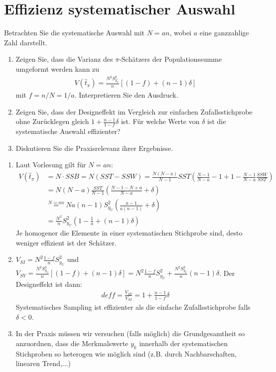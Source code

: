 \documentclass{article}
\begin{document}
\section{Effizienz systematischer Auswahl}
Betrachten Sie die systematische Auswahl mit $N=an$, wobei $a$ eine ganzzahlige Zahl darstellt.
\begin{enumerate}
\item Zeigen Sie, dass die Varianz des $\pi$-Schätzers der Populationssumme umgeformt werden kann zu
\begin{align*}
V(\hat{t}_\pi) = \frac{N^2 S_{y_U}^2}{n} [(1-f)+(n-1)\delta]
\end{align*}
mit $f=n/N=1/a$. Interpretieren Sie den Ausdruck.
\item Zeigen Sie, dass der Designeffekt im Vergleich zur einfachen Zufallsstichprobe ohne Zurücklegen gleich $1+\frac{n-1}{1-f}\delta$ ist. Für welche Werte von $\delta$ ist die systematische Auswahl effizienter?
\item Diskutieren Sie die Praxisrelevanz ihrer Ergebnisse.
\end{enumerate}
\begin{solution}
\begin{enumerate}
\item Laut Vorlesung gilt für $N=an$:
\begin{align*} 
V(\hat{t}_\pi) &= N\cdot SSB = N(SST-SSW) =\frac{N(N-a)}{N-1}SST \left(\frac{N-1}{N-a}-1 +1 -\frac{N-1}{N-a}\frac{SSW}{SST}\right)\\
&= N(N -a)\frac{SST}{N-1}\left(\frac{N-1 -N +a}{N-a} +\delta\right)\\
& \overset{N=an}{=} Na(n-1) S_{y_U}^2 \left(\frac{a-1}{a(n-1)}+\delta\right)\\
& = \frac{N^2}{n} S_{y_U}^2 \left(1-\frac{1}{a}+(n-1)\delta\right)
\end{align*}
Je homogener die Elemente in einer systematischen Stichprobe sind, desto weniger effizient ist der Schätzer.
\item $V_{SI} = N^2\frac{1-f}{n}S_{y_U}^2$ und $V_{SY} = \frac{N^2 S_{y_U}^2}{n} [(1-f)+(n-1)\delta] = N^2\frac{1-f}{n}S_{y_U}^2 + \frac{N^2 S_{y_U}^2}{n}(n-1)\delta$. Der Designeffekt ist dann:
\begin{align*}
deff = \frac{V_{SY}}{V_{SI}} = 1 + \frac{n-1}{1-f}\delta
\end{align*}
Systematisches Sampling ist effizienter als die einfache Zufallsstichprobe falls $\delta <0$.
\item In der Praxis müssen wir versuchen (falls möglich) die Grundgesamtheit so anzuordnen, dass die Merkmalswerte $y_k$ innerhalb der systematischen Stichproben so heterogen wie möglich sind (z.B. durch Nachbarschaften, linearen Trend,...)
\end{enumerate}
\end{solution}
\end{document}
